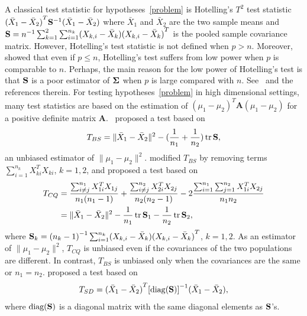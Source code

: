 \documentclass[3p]{elsarticle}
\DeclareMathOperator{\mytr}{tr}
\newcommand{\BA}{\mathbf{A}}    \newcommand{\BB}{\mathbf{B}}    \newcommand{\BC}{\mathbf{C}}    \newcommand{\BD}{\mathbf{D}}    \newcommand{\BE}{\mathbf{E}}    \newcommand{\BF}{\mathbf{F}}    \newcommand{\BG}{\mathbf{G}}    \newcommand{\BH}{\mathbf{H}}    \newcommand{\BI}{\mathbf{I}}    \newcommand{\BJ}{\mathbf{J}}    \newcommand{\BK}{\mathbf{K}}    \newcommand{\BL}{\mathbf{L}}
\theoremstyle{plain}
\theoremstyle{definition}
\theoremstyle{remark}
\begin{document}
A classical test statistic for hypotheses~\eqref{problem} is Hotelling's $T^2$ test  statistic ${(\bar{X}_1-\bar{X}_2)}^T \mathbf{S}^{-1}(\bar{X}_1-\bar{X}_2)$ where $\bar{X}_1$ and $\bar{X}_2$ are the two sample means and
    $
    \mathbf{S}=
n^{-1}\sum_{k=1}^2\sum_{i=1}^{n_k} (X_{k,i}-\bar{X}_k) {(X_{k,i}-\bar{X}_k)}^T
    $
is the pooled sample covariance matrix.
However, Hotelling's test statistic is not defined when $p>n$.
Moreover,~\cite{Bai1996Efiect} showed that even if $p\leq n$, Hotelling's test suffers from low power when $p$ is comparable to $n$.
Perhaps, the main reason for the low power of Hotelling's test is that $\mathbf{S}$ is a poor estimator of $\boldsymbol{\Sigma}$ when $p$ is large compared with $n$.
See~\cite{Chen2010A} and the references therein.
For testing hypotheses~\eqref{problem} in high dimensional settings,  
many test statistics are based on the estimation of  ${(\mu_1-\mu_2)}^T \BA(\mu_1-\mu_2)$ for a positive definite matrix $\BA$.~\cite{Bai1996Efiect} proposed a test based on
\begin{equation*}
    T_{BS}=\|\bar{X}_1-\bar{X}_2\|^2-(\frac{1}{n_1}+\frac{1}{n_2})\mytr \BS,
\end{equation*}
an unbiased estimator of $\|\mu_1-\mu_2\|^2$.
\cite{Chen2010A} modified $T_{BS}$ by removing terms $\sum_{i=1}^{n_k}X_{ki}^T X_{ki}$, $k=1,2$, and proposed a test based on
\begin{equation*}
    \begin{aligned}
        T_{CQ}&=\frac{\sum_{i\neq j}^{n_1}X_{1i}^T X_{1j}}{n_1(n_1-1)}+\frac{\sum_{i\neq j}^{n_2}X_{2i}^T X_{2j}}{n_2(n_2-1)}-2\frac{\sum_{i=1}^{n_1}\sum_{j=1}^{n_2}X_{1i}^T X_{2j}}{n_1n_2}
        \\
            &=\|\bar{X}_1-\bar{X}_2\|^2-\frac{1}{n_1}\mytr \BS_1-\frac{1}{n_2}\mytr \BS_2,
    \end{aligned}
\end{equation*}
where
$\mathbf{S}_k={(n_k -1)}^{-1}\sum_{i=1}^{n_k} (X_{k,i}-\bar{X}_k) {(X_{k,i}-\bar{X}_k)}^T
$, $k=1,2$.
As an estimator of $\|\mu_1-\mu_2\|^2$, $T_{CQ}$ is unbiased even if the covariances of the two populations are different.
In contrast, $T_{BS}$ is unbiased only when the covariances are the same or $n_1=n_2$.
\cite{Srivastava2008A} proposed a test based on
\begin{equation*}
    T_{SD}={(\bar{X}_1-\bar{X}_2)}^T {[\mathrm{diag}(\mathbf{S})]}^{-1}(\bar{X}_1-\bar{X}_2),
\end{equation*}
where $\textrm{diag} (\mathbf{S})$ is a diagonal matrix with the same diagonal elements as $\mathbf{S}$'s.
\end{document}
